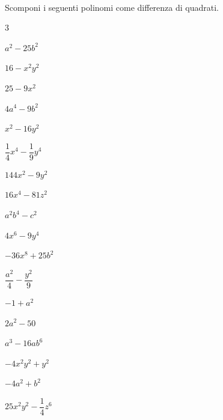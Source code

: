 \paragraph*{}

\begin{esercizio}
\label{ese:div.017}
Scomponi i seguenti polinomi come differenza di quadrati.
\begin{htmulticols}{3}
\begin{enumeratea}
\item \(a^{2}-25b^{2}\)
\item \(16-x^{2}y^{2}\)
\item \(25-9x^{2}\)
\item \(4a^{4}-9b^{2}\)
\item \(x^{2}-16y^{2}\)
\item \(\dfrac{1}{4}x^{4}-\dfrac{1}{9}y^{4}\)
\item \(144x^{2}-9y^{2}\)
\item \(16x^{4}-81z^{2}\)
\item \(a^{2}b^{4}-c^{2}\)
\item \(4x^{6}-9y^{4}\)
\item \(-36x^{8}+25b^{2}\)
\item \(\dfrac{a^{2}}{4}-\dfrac{y^{2}}{9}\)
\item \(-1+a^{2}\)
\item \(2a^{2}-50\)
\item \(a^{3}-16{ab}^{6}\)
\item \(-4x^{2}y^{2}+y^{2}\)
\item \(-4a^{2}+b^{2}\)
\item \(25x^{2}y^{2}-\dfrac{1}{4}z^{6}\)
\end{enumeratea}
\end{htmulticols}
\end{esercizio}

